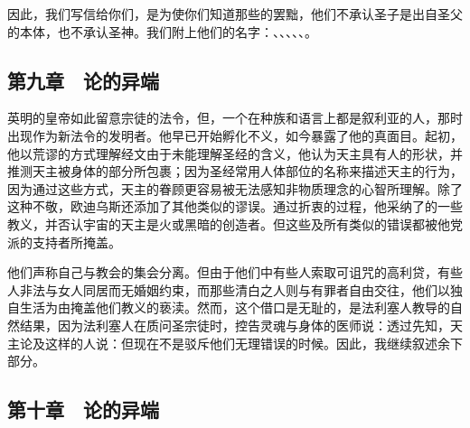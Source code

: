 因此，我们写信给你们，是为使你们知道那些的罢黜，他们不承认圣子是出自圣父的本体，也不承认圣神。我们附上他们的名字：、、、、、。\par

\par


\subsection{第九章　论的异端}

英明的皇帝如此留意宗徒的法令，但，一个在种族和语言上都是叙利亚的人，那时出现作为新法令的发明者。他早已开始孵化不义，如今暴露了他的真面目。起初，他以荒谬的方式理解经文由于未能理解圣经的含义，他认为天主具有人的形状，并推测天主被身体的部分所包裹；因为圣经常用人体部位的名称来描述天主的行为，因为通过这些方式，天主的眷顾更容易被无法感知非物质理念的心智所理解。除了这种不敬，欧迪乌斯还添加了其他类似的谬误。通过折衷的过程，他采纳了的一些教义，并否认宇宙的天主是火或黑暗的创造者。但这些及所有类似的错误都被他党派的支持者所掩盖。\par

他们声称自己与教会的集会分离。但由于他们中有些人索取可诅咒的高利贷，有些人非法与女人同居而无婚姻约束，而那些清白之人则与有罪者自由交往，他们以独自生活为由掩盖他们教义的亵渎。然而，这个借口是无耻的，是法利塞人教导的自然结果，因为法利塞人在质问圣宗徒时，控告灵魂与身体的医师说：透过先知，天主论及这样的人说：但现在不是驳斥他们无理错误的时候。因此，我继续叙述余下部分。\par


\subsection{第十章　论的异端}

